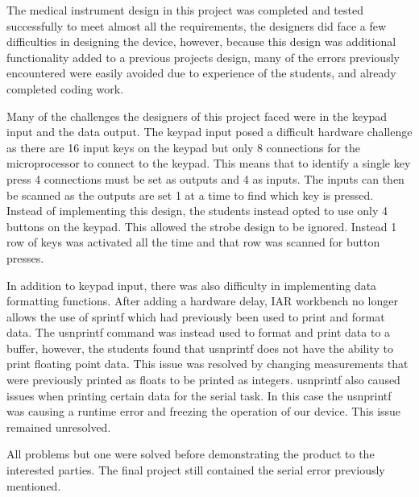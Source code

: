 \documentclass[12pt]{article} %
\begin{document}

    The medical instrument design in this project was completed and tested
    successfully to meet almost all the requirements, the designers did face a
    few difficulties in designing the device, however, because this design was
    additional functionality added to a previous projects design, many of the
    errors previously encountered were easily avoided due to experience of the
    students, and already completed coding work.
    
    
    Many of the challenges the designers of this project faced were in the
    keypad input and the data output. The keypad input posed a difficult
    hardware challenge as there are 16 input keys on the keypad but only 8
    connections for the microprocessor to connect to the keypad. This means
    that to identify a single key press 4 connections must be set as outputs
    and 4 as inputs. The inputs can then be scanned as the outputs are set 1 at
    a time to find which key is pressed. Instead of implementing this design,
    the students instead opted to use only 4 buttons on the keypad. This
    allowed the strobe design to be ignored. Instead 1 row of keys was
    activated all the time and that row was scanned for button presses.
    
    In addition to keypad input, there was also difficulty in implementing data
    formatting functions. After adding a hardware delay, IAR workbench no
    longer allows the use of sprintf which had previously been used to print
    and format data. The usnprintf command was instead used to format and print
    data to a buffer, however, the students found that usnprintf does not have
    the ability to print floating point data. This issue was resolved by
    changing measurements that were previously printed as floats to be printed
    as integers. usnprintf also caused issues when printing certain data for
    the serial task. In this case the usnprintf was causing a runtime error and
    freezing the operation of our device. This issue remained unresolved. 
    
    
    
    
    All problems but one were solved before demonstrating the product to the interested
    parties. The final project still contained the serial error previously mentioned.
    
\end{document}

